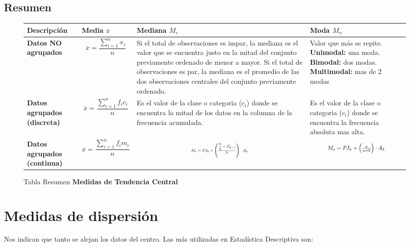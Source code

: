 \documentclass{templateNote}
\begin{document}
\subsection{Resumen}
\begin{figure}[H]
    \centering
    \begin{tabularx}{\textwidth}{|L|L|L|L|}
        \hline
        \textbf{Descripción} & \textbf{Media $\overline{x}$} & \textbf{Mediana $M_e$} & \textbf{Moda $M_o$} \\
        \hline
        \textbf{Datos NO agrupados} & 
        \[
            \overline{x} = \frac{\displaystyle \sum_{i=1}^{n} x_i}{n}
        \] & Si el total de observaciones es impar, la mediana es el valor que se encuentra justo en la mitad del conjunto previamente ordenado de menor a mayor. Si el total de observaciones es par, la mediana es el promedio de las dos observaciones centrales del conjunto previamente ordenado. &
        Valor que más se repite. \textbf{Unimodal:} una moda. \textbf{Bimodal:} dos modas. \textbf{Multimodal:} mas de 2 modas\\
        \hline
        \textbf{Datos agrupados (discreta)} & 
        \[
            \overline{x} = \frac{\displaystyle \sum_{i=1}^{n} f_i c_i}{n}
        \] & Es el valor de la clase o categoria ($c_i$) donde se encuentra la mitad de los datos en la columna de la frecuencia acumulada. &
        Es el valor de la clase o categoria ($c_i$) donde se encuentra la frecuencia absoluta mas alta.\\
        \hline
        \textbf{Datos agrupados (continua)} & 
        \[
            \overline{x} = \frac{\displaystyle \sum_{i=1}^{n} f_i m_i}{n}
        \] &
        \begin{equation*}
            \scalebox{0.6}{$M_e = FI_k + \left(\frac{\displaystyle \frac{n}{2} - F_{k-1}}{f_k}\right) \cdot A_k$}   
        \end{equation*}
        &
        \begin{equation*}
            \scalebox{0.8}{$M_o = FI_k + \left(\frac{a}{a+b}\right) \cdot A_k$}
        \end{equation*} \\
        \hline
    \end{tabularx}
    \caption{Tabla Resumen \textbf{Medidas de Tendencia Central}}
\end{figure}

\newpage
\section{Medidas de dispersión}
\indent
Nos indican que tanto se alejan los datos del centro. Las más utilizadas en Estadística
Descriptiva son:
\end{document}
